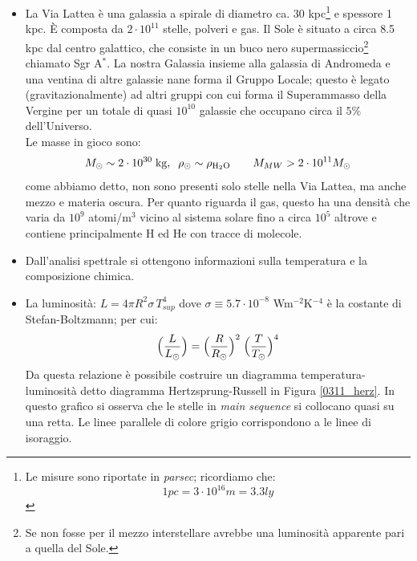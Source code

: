 \begin{itemize}
    \item La Via Lattea è una galassia a spirale di diametro ca. 30 kpc\footnote{Le misure sono riportate in \textit{parsec}; ricordiamo che:
    $$1 \unit{pc} = 3\cdot 10^{16} \unit{m} = 3.3 \unit{ly}$$%
    } e spessore 1 kpc. \`E composta da $2\cdot 10^{11}$ stelle, polveri e gas. Il Sole è situato a circa 8.5 kpc dal centro galattico, che consiste in un buco nero supermassiccio\footnote{Se non fosse per il mezzo interstellare avrebbe una luminosità apparente pari a quella del Sole.} chiamato Sgr A$^*$. La nostra Galassia insieme alla galassia di Andromeda e una ventina di altre galassie nane forma il Gruppo Locale; questo è legato (gravitazionalmente) ad altri gruppi con cui forma il Superammasso della Vergine per un totale di quasi $10^{10}$ galassie che occupano circa il $5\%$ dell'Universo.\\
    Le masse in gioco sono:
    $$M\sol\sim 2\cdot10^{30} \unit{kg}, \;\; \rho\sol \sim \rho_{\ce{H_2O}} \qquad M_{MW} > 2\cdot 10^{11} M\sol$$
    come abbiamo detto, non sono presenti solo stelle nella Via Lattea, ma anche mezzo e materia oscura. Per quanto riguarda il gas, questo ha una densità che varia da $10^9$ atomi/m$^3$ vicino al sistema solare fino a circa $10^5$ altrove e contiene principalmente H ed He con tracce di molecole.
    \item Dall'analisi spettrale si ottengono informazioni sulla temperatura e la composizione chimica.
    \item La luminosità: $L = 4\pi R^2 \sigma\, T_{sup}^4$ dove $\sigma \equiv 5.7\cdot10^{-8}$ Wm$^{-2}$K$^{-4}$ è  la costante di Stefan-Boltzmann; per cui:
    $$\Bigl ( \frac{L}{L_{\odot}} \Bigr ) = \Bigl ( \frac{R}{R_{\odot}}\Bigr )^2 \; \Bigl (\frac{T}{T_{\odot}} \Bigr )^4$$
    Da questa relazione è possibile costruire un diagramma temperatura-luminosità detto diagramma Hertzsprung-Russell in Figura \ref{0311_herz}. In questo grafico si osserva che le stelle in \textit{main sequence} si collocano quasi su una retta. Le linee parallele di colore grigio corrispondono a le linee di isoraggio.
    \begin{figure}[h]
    \centering

\end{figure}
\end{itemize}
